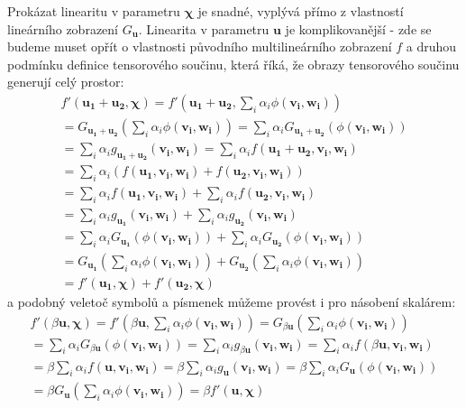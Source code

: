 \documentclass[a5paper,12pt]{amsbook}
\theoremstyle{definition}
\newcommand{\myvec}[1]{\bm{#1}}
\begin{document}
Prokázat linearitu v parametru $\myvec{\chi}$ je snadné, vyplývá přímo z vlastností lineárního
zobrazení $G_{\myvec{u}}$. Linearita v parametru $\myvec{u}$ je komplikovanější - zde se budeme
muset opřít o vlastnosti původního multilineárního zobrazení $f$ a druhou podmínku definice
tensorového součinu, která říká, že obrazy tensorového součinu generují celý prostor:
\begin{equation*}
\begin{split}
f'(\myvec{u_1}+\myvec{u_2}, \myvec{\chi}) 
  = f'(\myvec{u_1}+\myvec{u_2}, \sum_{i}\alpha_i\phi(\myvec{v_i}, \myvec{w_i})) \\
= G_{\myvec{u_1} + \myvec{u_2}}(\sum_{i}\alpha_i\phi(\myvec{v_i}, \myvec{w_i}))
  = \sum_{i}\alpha_i G_{\myvec{u_1} + \myvec{u_2}}(\phi(\myvec{v_i}, \myvec{w_i})) \\
= \sum_{i}\alpha_i g_{\myvec{u_1} + \myvec{u_2}}(\myvec{v_i}, \myvec{w_i})
  = \sum_{i}\alpha_i f(\myvec{u_1} + \myvec{u_2}, \myvec{v_i}, \myvec{w_i}) \\
= \sum_{i}\alpha_i (f(\myvec{u_1}, \myvec{v_i}, \myvec{w_i}) + f(\myvec{u_2}, \myvec{v_i}, \myvec{w_i})) \\
= \sum_{i}\alpha_i f(\myvec{u_1}, \myvec{v_i}, \myvec{w_i}) 
  + \sum_{i}\alpha_i f(\myvec{u_2}, \myvec{v_i}, \myvec{w_i}) \\
= \sum_{i}\alpha_i g_{\myvec{u_1}}(\myvec{v_i}, \myvec{w_i}) 
  + \sum_{i}\alpha_i g_{\myvec{u_2}}(\myvec{v_i}, \myvec{w_i}) \\
= \sum_{i}\alpha_i G_{\myvec{u_1}}(\phi(\myvec{v_i}, \myvec{w_i})) 
  + \sum_{i}\alpha_i G_{\myvec{u_2}}(\phi(\myvec{v_i}, \myvec{w_i})) \\
= G_{\myvec{u_1}}(\sum_{i}\alpha_i\phi(\myvec{v_i}, \myvec{w_i})) 
  + G_{\myvec{u_2}}(\sum_{i}\alpha_i\phi(\myvec{v_i}, \myvec{w_i})) \\
= f'(\myvec{u_1}, \myvec{\chi}) + f'(\myvec{u_2}, \myvec{\chi})
\end{split}
\end{equation*}
a podobný veletoč symbolů a písmenek můžeme provést i pro násobení skalárem:
\begin{equation*}
\begin{split}
f'(\beta\myvec{u}, \myvec{\chi}) 
= f'(\beta\myvec{u}, \sum_{i}\alpha_i\phi(\myvec{v_i}, \myvec{w_i}))
= G_{\beta\myvec{u}}(\sum_{i}\alpha_i\phi(\myvec{v_i}, \myvec{w_i})) \\
= \sum_{i}\alpha_i G_{\beta\myvec{u}}(\phi(\myvec{v_i}, \myvec{w_i}))
= \sum_{i}\alpha_i g_{\beta\myvec{u}}(\myvec{v_i}, \myvec{w_i})
= \sum_{i}\alpha_i f(\beta\myvec{u}, \myvec{v_i}, \myvec{w_i}) \\
= \beta\sum_{i}\alpha_i f(\myvec{u}, \myvec{v_i}, \myvec{w_i})
= \beta\sum_{i}\alpha_i g_{\myvec{u}}(\myvec{v_i}, \myvec{w_i})
= \beta\sum_{i}\alpha_i G_{\myvec{u}}(\phi(\myvec{v_i}, \myvec{w_i})) \\
= \beta G_{\myvec{u}}(\sum_{i}\alpha_i\phi(\myvec{v_i}, \myvec{w_i}))
= \beta f'(\myvec{u}, \myvec{\chi})
\end{split}
\end{equation*}
\end{document}
